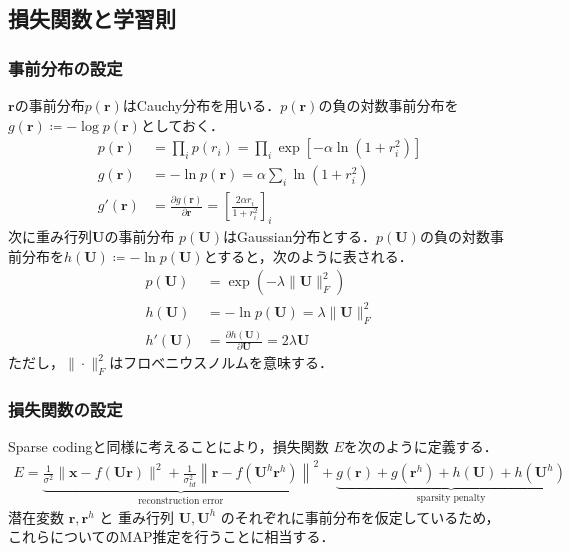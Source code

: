 \subsection{損失関数と学習則}
\subsubsection{事前分布の設定}
$\mathbf{r}$の事前分布$p(\mathbf{r})$はCauchy分布を用いる．$p(\mathbf{r})$の負の対数事前分布を$g(\mathbf{r})\coloneqq-\log p(\mathbf{r})$としておく．
\begin{align}
p(\mathbf{r})&=\prod_i p(r_i)=\prod_i \exp\left[-\alpha \ln(1+r_i^2)\right]\\
g(\mathbf{r})&=-\ln p(\mathbf{r})=\alpha \sum_i \ln(1+r_i^2)\\
g'(\mathbf{r})&=\frac{\partial g(\mathbf{r})}{\partial \mathbf{r}}=\left[\frac{2\alpha r_i}{1+r_i^2}\right]_i
\end{align}
次に重み行列$\mathbf{U}$の事前分布 $p(\mathbf{U})$はGaussian分布とする．$p(\mathbf{U})$の負の対数事前分布を$h(\mathbf{U})\coloneqq-\ln p(\mathbf{U})$とすると，次のように表される．
\begin{align}
p(\mathbf{U})&=\exp(-\lambda\|\mathbf{U}\|^2_F)\\
h(\mathbf{U})&=-\ln p(\mathbf{U})=\lambda\|\mathbf{U}\|^2_F\\
h'(\mathbf{U})&=\frac{\partial h(\mathbf{U})}{\partial \mathbf{U}}=2\lambda \mathbf{U}
\end{align}
ただし，$\|\cdot \| _ F^2$はフロベニウスノルムを意味する．
\subsubsection{損失関数の設定}
Sparse codingと同様に考えることにより，損失関数 $E$を次のように定義する．
\begin{align}
E=\underbrace{\frac{1}{\sigma^{2}}\|\mathbf{x}-f(\mathbf{U} \mathbf{r})\|^2+\frac{1}{\sigma_{t d}^{2}}\left\|\mathbf{r}-f(\mathbf{U}^h \mathbf{r}^h)\right\|^2}_{\text{reconstruction error}}+\underbrace{g(\mathbf{r})+g(\mathbf{r}^{h})+h(\mathbf{U})+h(\mathbf{U}^h)}_{\text{sparsity penalty}}
\end{align}
潜在変数 $\mathbf{r}, \mathbf{r}^h$ と 重み行列 $\mathbf{U}, \mathbf{U}^h$ のそれぞれに事前分布を仮定しているため，これらについてのMAP推定を行うことに相当する．
